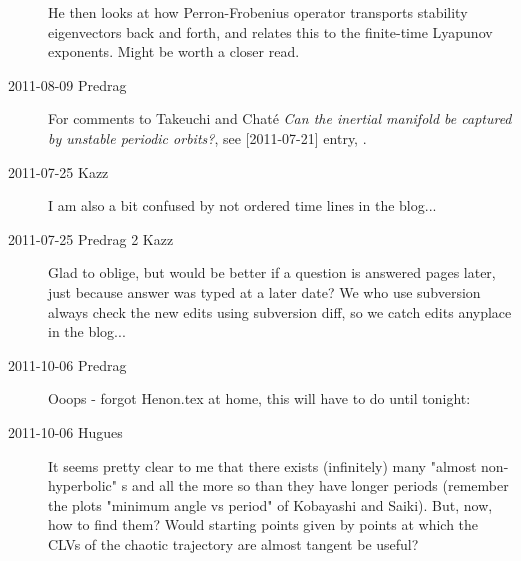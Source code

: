 \begin{description}
He then looks at how Perron-Frobenius operator transports
stability eigenvectors back and forth, and relates this to
the finite-time Lyapunov exponents. Might be worth a closer read.

\item[2011-08-09 Predrag] For comments to Takeuchi and Chat\'e
\emph{Can the inertial manifold be captured by unstable periodic
orbits?}, see [2011-07-21] entry, .

\item[2011-07-25 Kazz]
I am also a bit confused by not ordered time lines in the blog...

\item[2011-07-25 Predrag 2 Kazz]
Glad to oblige, but would be better if a question is answered pages
later, just because answer was typed at a later date? We who use subversion
always check the new edits using subversion diff, so we catch
edits anyplace in the blog...

\item[2011-10-06 Predrag] Ooops - forgot Henon.tex at home, this will
have to do until tonight:

\item[2011-10-06 Hugues] 
It seems pretty clear to me that there exists (infinitely) many "almost non-hyperbolic" \po s and all the more so than they have longer periods (remember the plots "minimum angle vs period" of Kobayashi and Saiki). But, now, how to find them? Would starting points given by points at which the CLVs of the chaotic trajectory are almost tangent be useful?


\end{description}
